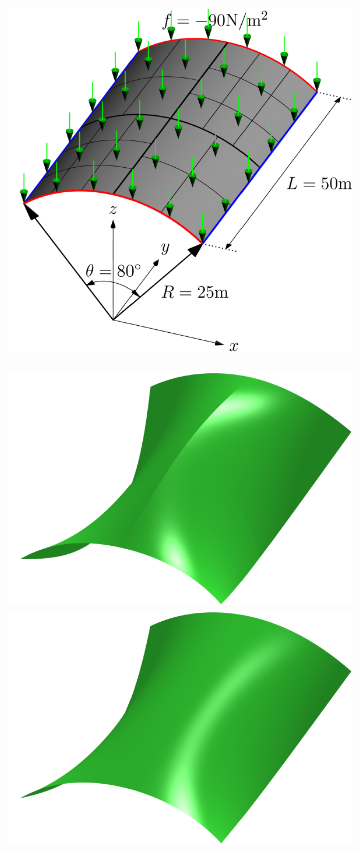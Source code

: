 \begin{figure}[h]
	\centering
	\captionsetup[subfigure]{font = footnotesize}
	\begin{subfigure}[b]{.33\textwidth}
		\centering
		\includegraphics[width = \textwidth]{roof_config1}
		\caption{}\label{fig:scordelis-lo}
	\end{subfigure}\hfil
	\begin{subfigure}[b]{.66\textwidth}
		\centering
		\includegraphics[width = .48\textwidth]{roof_c0_result}
		\includegraphics[width = .48\textwidth]{roof_c1_result}

\end{subfigure}
\end{figure}
